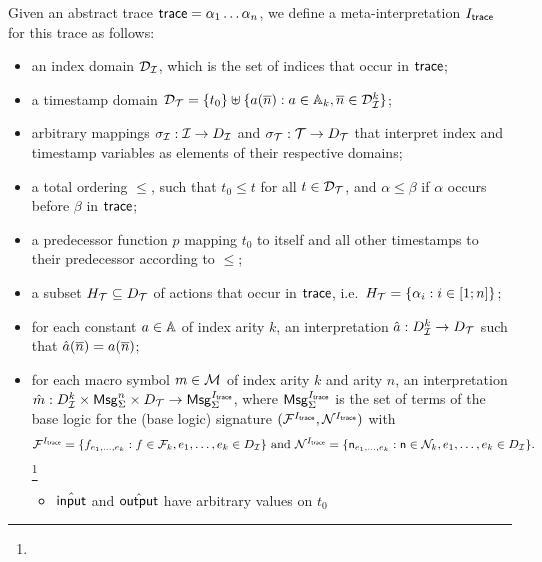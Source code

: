 \begin{definition}
  Given an abstract trace $\textsf{trace} = \alpha_1\ldots\alpha_n$,
  we define a meta-interpretation $I_{\textsf{trace}}$ for this trace as follows:
  \begin{itemize}
    \item an index domain $\mathcal{D}_{\mathcal{I}}$, which is the set of indices that occur in $\textsf{trace}$;
    \item a timestamp domain $\mathcal{D}_{\mathcal{T}} = \{ t_0 \} \uplus \{ a(\overline{n}) : a\in\mathbb{A}_k,
      \overline{n}\in\mathcal{D}_{\mathcal{I}}^k \}$;
    \item arbitrary mappings $\sigma_{\mathcal{I}} : \mathcal{I} \to D_{\mathcal{I}}$
      and $\sigma_{\mathcal{T}} : \mathcal{T} \to D_{\mathcal{T}}$ that interpret index and
      timestamp variables as elements of their respective domains;
    \item a total ordering $\leq$, such that $t_0\leq t$ for all $t\in\mathcal{D}_{\mathcal{T}}$,
      and $\alpha\leq\beta$ if $\alpha$ occurs before $\beta$ in $\textsf{trace}$;
    \item a predecessor function $p$ mapping $t_0$ to itself and all
      other timestamps to their predecessor according to $\leq$;
    \item a subset $H_{\mathcal{T}}\subseteq D_{\mathcal{T}}$  of actions that occur in $\textsf{trace}$,
      i.e.\ $H_{\mathcal{T}}=\{\alpha_i : i\in[1;n]\}$;
    \item for each constant $a \in \mathbb{A}$ of index arity $k$,
    an interpretation $\hat{a} : D_{\mathcal{I}}^k \to D_{\mathcal{T}}$ such that
    $\hat{a}(\overline{n}) = a(\overline{n})$;
    \item for each macro symbol $m \in \mathcal{M}$ of index
      arity $k$ and arity $n$, an interpretation
      $\hat{m} : D_{\mathcal{I}}^k \times \mathsf{Msg}_\Sigma^n \times D_{\mathcal{T}} \to \mathsf{Msg}^{I_{\textsf{trace}}}_\Sigma$,
      where $\mathsf{Msg}^{I_{\textsf{trace}}}_\Sigma$ is the set of terms of the base
      logic for the (base logic) signature
      $(\mathcal{F}^{I_{\textsf{trace}}},\mathcal{N}^{I_{\textsf{trace}}})$ with
      $$\mathcal{F}^{I_{\textsf{trace}}} =
        \{ f_{e_1,\ldots,e_k} : f \in \mathcal{F}_k, e_1,\ldots,e_k \in D_{\mathcal{I}} \}
        \text{ and }
        \mathcal{N}^{I_{\textsf{trace}}} = \{ \mathsf{n}_{e_1,\ldots,e_k} : \mathsf{n}\in\mathcal{N}_k,
        e_1,\ldots,e_k\in D_{\mathcal{I}} \}.$$
      \footnote{}
    \begin{itemize}
      \item $\hat{\textsf{input}}$ and $\hat{\textsf{output}}$ have arbitrary values on $t_0$

\end{itemize}
\end{itemize}
\end{definition}
